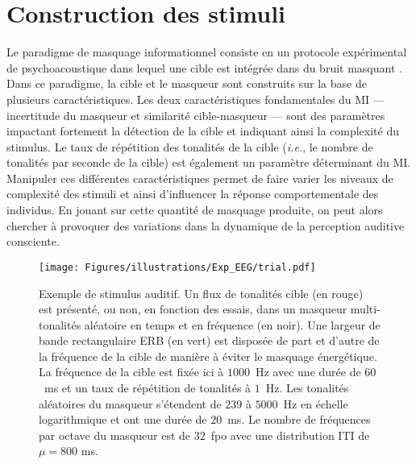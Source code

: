 \section{Construction des stimuli}
\label{constructionstimuli}

Le paradigme de masquage informationnel consiste en un protocole expérimental de psychoacoustique dans lequel une cible est intégrée dans du bruit masquant \citep{kidd2008informationalreview, neff1987masking, richards2004cuing}. 
Dans ce paradigme, la cible et le masqueur sont construits sur la base de plusieurs caractéristiques. 
Les deux caractéristiques fondamentales du MI --- incertitude du masqueur et similarité cible-masqueur --- sont des paramètres impactant fortement la détection de la cible et indiquant ainsi la complexité du stimulus. 
Le taux de répétition des tonalités de la cible (\textit{i.e.}, le nombre de tonalités par seconde de la cible) est également un paramètre déterminant du MI. 
Manipuler ces différentes caractéristiques permet de faire varier les niveaux de complexité des stimuli et ainsi d'influencer la réponse comportementale des individus. 
En jouant sur cette quantité de masquage produite, on peut alors chercher à provoquer des variations dans la dynamique de la perception auditive consciente. 

\begin{figure*}[!t]
\centering
\texttt{[image: Figures/illustrations/Exp\_EEG/trial.pdf]}
\caption[Illustration graphique d'un stimulus de masquage informationnel]{Exemple de stimulus auditif. Un flux de tonalités cible (en rouge) est présenté, ou non, en fonction des essais, dans un masqueur multi-tonalités aléatoire en temps et en fréquence (en noir). Une largeur de bande rectangulaire ERB (en vert) est disposée de part et d'autre de la fréquence de la cible de manière à éviter le masquage énergétique. La fréquence de la cible est fixée ici à $1000$~Hz avec une durée de $60$~ms et un taux de répétition de tonalités à $1$~Hz. Les tonalités aléatoires du masqueur s'étendent de $239$ à $5000$~Hz en échelle logarithmique et ont une durée de $20$~ms. Le nombre de fréquences par octave du masqueur est de $32$~fpo avec une distribution ITI de $\mu = 800$ ms.}
\label{fig:figure3illustrationstimulus}
\end{figure*}

